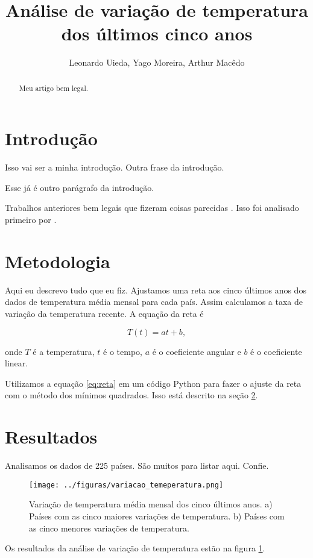 \documentclass{article}
\begin{document}
\title{Análise de variação de temperatura dos últimos cinco anos}
\author{Leonardo Uieda, Yago Moreira, Arthur Macêdo}

\maketitle

\begin{abstract}
Meu artigo bem legal.
\end{abstract}

\section{Introdução}

Isso vai ser a minha introdução.
Outra frase da introdução.

Esse já é outro parágrafo da introdução.

Trabalhos anteriores bem legais que fizeram coisas parecidas
\citep{Osman2021}.
Isso foi analisado primeiro por \citet{Osman2021}.

\section{Metodologia}
\label{sec:metodos}

Aqui eu descrevo tudo que eu fiz.
Ajustamos uma reta aos cinco últimos anos dos dados de temperatura média mensal para cada país.
Assim calculamos a taxa de variação da temperatura recente.
A equação da reta é

\begin{equation}
T(t) = a t + b,
\label{eq:reta}
\end{equation}

\noindent
onde $T$ é a temperatura, $t$ é o tempo, $a$ é o coeficiente angular e $b$ é o coeficiente linear.

Utilizamos a equação \ref{eq:reta} em um código Python para fazer o ajuste da reta com o método dos mínimos quadrados.
Isso está descrito na seção \ref{sec:metodos}.

\section{Resultados}

Analisamos os dados de 225 países. São muitos para listar aqui. Confie.

\begin{figure}[!h]
	\centering
	\texttt{[image: ../figuras/variacao\_temeperatura.png]}
	\caption{
		Variação de temperatura média mensal dos cinco últimos anos.
		a) Países com as cinco maiores variações de temperatura.
		b) Países com as cinco menores variações de temperatura.
	}
	\label{fig:variacao}
\end{figure}

Os resultados da análise de variação de temperatura estão na figura \ref{fig:variacao}.



\end{document}
